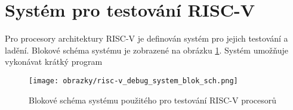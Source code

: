 \section{Systém pro testování \acs{RISC-V}}
Pro procesory architektury \acs{RISC-V} je definován systém pro jejich testování a ladění. Blokové schéma systému je zobrazené na obrázku \ref{fig:blok_sch_risc-v_dbg}. Systém umožňuje vykonávat krátký program 

\begin{figure}[!h]
  \begin{center}
    \texttt{[image: obrazky/risc-v\_debug\_system\_blok\_sch.png]}
  \end{center}
  \caption{Blokové schéma systému použitého pro testování \acs{RISC-V} procesorů \cite{risc-v_dbg}}
	\label{fig:blok_sch_risc-v_dbg}
\end{figure}